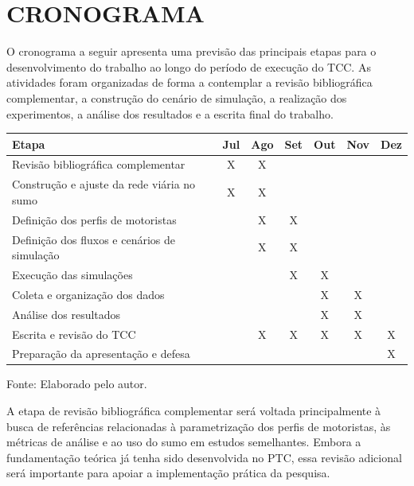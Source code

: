 \chapter{CRONOGRAMA}

O cronograma a seguir apresenta uma previsão das principais etapas para o desenvolvimento do trabalho ao longo do período de execução do TCC. As atividades foram organizadas de forma a contemplar a revisão bibliográfica complementar, a construção do cenário de simulação, a realização dos experimentos, a análise dos resultados e a escrita final do trabalho.

\begin{quadro}[htbp]
\centering
\caption{Cronograma previsto para o desenvolvimento do TCC}
\label{qua:cronograma}
\small
\renewcommand{\arraystretch}{1.2}

\begin{tabular}{|p{9cm} | c | c | c | c | c | c|}
\hline
\textbf{Etapa} & \textbf{Jul} & \textbf{Ago} & \textbf{Set} & \textbf{Out} & \textbf{Nov} & \textbf{Dez} \\
\hline
Revisão bibliográfica complementar & X & X &  &  &  &  \\
\hline
Construção e ajuste da rede viária no \gls{sumo} & X & X &  &  &  &  \\
\hline
Definição dos perfis de motoristas &  & X & X &  &  &  \\
\hline
Definição dos fluxos e cenários de simulação &  & X & X &  &  &  \\
\hline
Execução das simulações &  &  & X & X &  &  \\
\hline
Coleta e organização dos dados &  &  &  & X & X &  \\
\hline
Análise dos resultados &  &  &  & X & X &  \\
\hline
Escrita e revisão do TCC &  & X & X & X & X & X \\
\hline
Preparação da apresentação e defesa &  &  &  &  &  & X \\
\hline
\end{tabular}

\par\vspace{0.25cm}
\begin{minipage}{\textwidth}
\footnotesize Fonte: Elaborado pelo autor.
\end{minipage}

\end{quadro}

A etapa de revisão bibliográfica complementar será voltada principalmente à busca de referências relacionadas à parametrização dos perfis de motoristas, às métricas de análise e ao uso do \gls{sumo} em estudos semelhantes. Embora a fundamentação teórica já tenha sido desenvolvida no PTC, essa revisão adicional será importante para apoiar a implementação prática da pesquisa.

